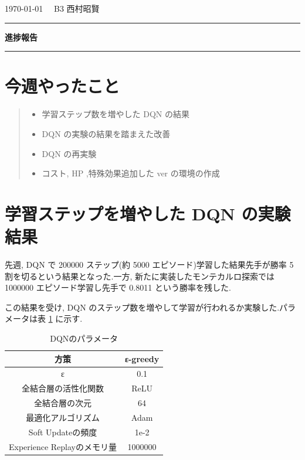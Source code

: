\documentclass{jarticle}     %
\begin{document}
  \noindent
  \onecolumn
  \hspace{1em}

  \today
  \hfill
  \ \ B3 西村昭賢 

  \vspace{2mm}
  \hrule
  \begin{center}
  {\Large \bf 進捗報告}
  \end{center}
  \hrule
  \vspace{3mm}


\section{今週やったこと}
\begin{quote}
  \begin{itemize}
   \item 学習ステップ数を増やした DQN の結果
   \item DQN の実験の結果を踏まえた改善
   \item DQN の再実験
   \item コスト, HP ,特殊効果追加した ver の環境の作成
  \end{itemize}
 \end{quote}


\section{学習ステップを増やした DQN の実験結果}
先週, DQN で 200000 ステップ(約 5000 エピソード)学習した結果先手が勝率 5 割を切るという結果となった.一方, 新たに実装したモンテカルロ探索では 1000000 エピソード学習し先手で 0.8011 という勝率を残した.\par
この結果を受け, DQN のステップ数を増やして学習が行われるか実験した.パラメータは表 \ref{table:param} に示す.
\begin{table}[h]
  \centering
  \caption{DQNのパラメータ}
  \label{table:param}
  \begin{tabular}{|c||c|}
  \hline
  方策                 & ε-greedy \\ \hline
  ε                      & 0.1      \\ \hline
  全結合層の活性化関数             & ReLU     \\ \hline
  全結合層の次元                & 64       \\ \hline
  最適化アルゴリズム              & Adam     \\ \hline
  Soft Updateの頻度               & 1e-2     \\ \hline
  Experience Replayのメモリ量 & 1000000  \\ \hline
  \end{tabular}
  \end{table}
\end{document}
